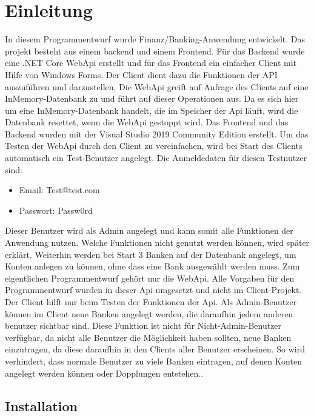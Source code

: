 \chapter{Einleitung}
In diesem Programmentwurf wurde Finanz/Banking-Anwendung entwickelt. Das projekt besteht aus einem backend und einem Frontend. Für das Backend wurde eine .NET Core WebApi 
erstellt und für das Frontend ein einfacher Client mit Hilfe von Windows Forms. Der Client dient dazu die Funktionen der API auszuführen und darzustellen. Die WebApi 
greift auf Anfrage des Clients auf eine InMemory-Datenbank zu und führt auf dieser Operationen aus. Da es sich hier um eine InMemory-Datenbank handelt, die im Speicher der Api läuft, 
wird die Datenbank resettet, wenn die WebApi gestoppt wird. 
\newline Das Frontend und das Backend wurden mit der Visual Studio 2019 Community Edition erstellt.
\newline Um das Testen der WebApi durch den Client zu vereinfachen, wird bei Start des Clients automatisch ein Test-Benutzer angelegt. Die Anmeldedaten für diesen Testnutzer sind:
\begin{itemize}
    \item Email: Test@test.com
    \item Passwort: Passw0rd
\end{itemize}
Dieser Benutzer wird als Admin angelegt und kann somit alle Funktionen der Anwendung nutzen. Welche Funktionen nicht genutzt werden können, wird später erklärt.
\newline Weiterhin werden bei Start 3 Banken auf der Datenbank angelegt, um Konten anlegen zu können, ohne dass eine Bank ausgewählt werden muss.
\newline Zum eigentlichen Programmentwurf gehört nur die WebApi. Alle Vorgaben für den Programmentwurf wurden in dieser Api umgesetzt und nicht im Client-Projekt. 
Der Client hilft nur beim Testen der Funktionen der Api.
\newline Als Admin-Benutzer können im Client neue Banken angelegt werden, die daraufhin jedem anderen benutzer sichtbar sind. Diese Funktion ist nicht für Nicht-Admin-Benutzer 
verfügbar, da nicht alle Benutzer die Möglichkeit haben sollten, neue Banken einzutragen, da diese daraufhin in den Clients aller Benutzer erscheinen. So wird verhindert, dass 
normale Benutzer zu viele Banken eintragen, auf denen Konten angelegt werden können oder Dopplungen entstehen.. 
\section{Installation}
